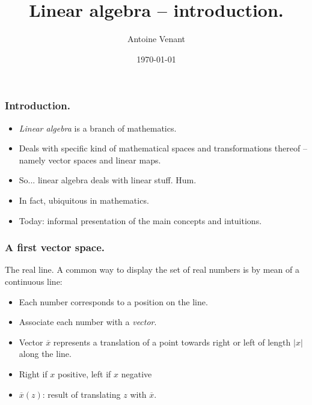 \documentclass{beamer}
\begin{document}
\title{Linear algebra -- introduction.} 
\author{Antoine Venant}
\date{\today}
\maketitle

\begin{frame}
  \frametitle{Introduction.}
  \begin{itemize}
  \item \emph{Linear algebra} is a branch of mathematics.
  \item Deals with specific kind of mathematical spaces and transformations thereof -- namely vector spaces and linear maps.
  \item So... linear algebra deals with linear stuff. Hum.
  \item In fact, ubiquitous in mathematics.
  \item Today: informal presentation of the main concepts and intuitions.
  \end{itemize}
\end{frame}

\begin{frame}
  \frametitle{A first vector space.}
  \begin{exampleblock}{The real line.}
    A common way to display the set of real numbers is by mean of a continuous line:
    \begin{center}
      \begin{overprint}
      \end{overprint}
    \end{center}
    \begin{itemize}
    \item<1-> Each number corresponds to a position on the line.
    \item<2-> Associate each number with a \emph{vector}.
    \item<3-> Vector $\overline x$ represents a translation of a point towards right or left of length $|x|$ along the line.
    \item<4-> Right if $x$ positive, left if $x$ negative 
    \item<5-> $\overline x(z)$: result of translating $z$ with $\overline x$. 
    \end{itemize}
  \end{exampleblock}
\end{frame}
\end{document}
